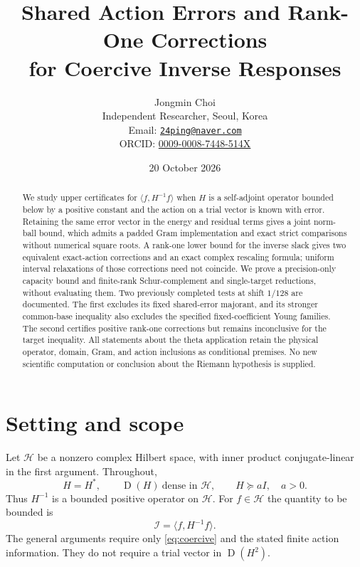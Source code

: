 \documentclass[11pt,a4paper]{article}
\title{Shared Action Errors and Rank-One Corrections\\
for Coercive Inverse Responses}
\author{Jongmin Choi\\[2pt]
\small Independent Researcher, Seoul, Korea\\
\small Email: \href{mailto:24ping@naver.com}{\texttt{24ping@naver.com}}\\
\small ORCID: \href{https://orcid.org/0009-0008-7448-514X}{0009-0008-7448-514X}}
\date{20 October 2026}
\newcommand{\HH}{\mathcal H}
\newcommand{\Dom}{\operatorname{D}}
\newcommand{\ip}[2]{\langle #1,#2\rangle}
\newcommand{\Iresp}{\mathcal I}
\theoremstyle{definition}
\theoremstyle{remark}
\numberwithin{equation}{section}
\begin{document}
\maketitle
\begin{abstract}
We study upper certificates for $\ip f{H^{-1}f}$ when $H$ is a
self-adjoint operator bounded below by a positive constant and the action
on a trial vector is known with error. Retaining the same error vector in
the energy and residual terms gives a joint norm-ball bound, which admits
a padded Gram implementation and exact strict comparisons without
numerical square roots. A rank-one lower bound for the inverse slack gives
two equivalent exact-action corrections and an exact complex rescaling
formula; uniform interval relaxations of those corrections need not
coincide. We prove a precision-only capacity bound and finite-rank
Schur-complement and single-target reductions, without evaluating them.
Two previously completed tests at shift $1/128$ are documented. The first
excludes its fixed shared-error majorant, and its stronger common-base
inequality also excludes the specified fixed-coefficient Young families.
The second certifies positive rank-one corrections but remains
inconclusive for the target inequality. All statements about the theta
application retain the physical operator, domain, Gram, and action
inclusions as conditional premises. No new scientific computation or
conclusion about the Riemann hypothesis is supplied.
\end{abstract}

\section{Setting and scope}\label{sec:setting}

Let $\HH$ be a nonzero complex Hilbert space, with inner product conjugate-linear
in the first argument. Throughout,
\begin{equation}\label{eq:coercive}
 H=H^*,\qquad \Dom(H)\ \text{dense in }\HH,\qquad H\succeq aI,\quad a>0.
\end{equation}
Thus $H^{-1}$ is a bounded positive operator on $\HH$. For $f\in\HH$ the
quantity to be bounded is
\[
 \Iresp=\ip f{H^{-1}f}.
\]
The general arguments require only \eqref{eq:coercive} and the stated
finite action information. They do not require a trial vector in
$\Dom(H^2)$.
\end{document}
